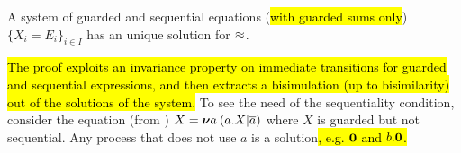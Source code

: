 \begin{theorem}
\label{t:Mil89}
A system of guarded and sequential equations (\hl{with guarded sums only})
$\{  X_i = E_i\}_{i\in I}$ has an unique solution for $\approx$.
\end{theorem}

\hl{The proof exploits an invariance property on immediate transitions for
guarded and sequential expressions, and then extracts a bisimulation
(up to bisimilarity) out
of the solutions of the system.  }
To see the need of the sequentiality  condition, consider
 the equation (from \cite{Mil89}) $X = {\boldsymbol \nu} a\: (a. X | \overline{a})$
where $X$ is guarded but not sequential. Any process that does not use
$a$ is a solution\hl{, e.g. ${\boldsymbol 0}$ and $b.{\boldsymbol 0}$.}


